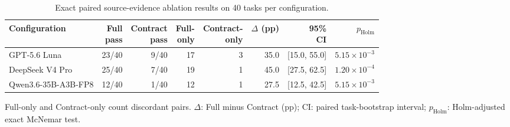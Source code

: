 \begin{table}[tbp]
  \centering
  \footnotesize
  \caption{Exact paired source-evidence ablation results on 40 tasks per configuration.}
  \label{tab:paired-ablation}
  \begin{tabularx}{\linewidth}{@{}Xrrrrrrr@{}}
    \toprule
    Configuration & \shortstack{Full\\pass} & \shortstack{Contract\\pass} & \shortstack{Full-\\only} & \shortstack{Contract-\\only} & \shortstack{$\Delta$\\(pp)} & \shortstack{95\%\\CI} & $p_{\mathrm{Holm}}$ \\
    \midrule
    GPT-5.6 Luna & 23/40 & 9/40 & 17 & 3 & 35.0 & [15.0, 55.0] & $5.15\times10^{-3}$ \\
    DeepSeek V4 Pro & 25/40 & 7/40 & 19 & 1 & 45.0 & [27.5, 62.5] & $1.20\times10^{-4}$ \\
    Qwen3.6-35B-A3B-FP8 & 12/40 & 1/40 & 12 & 1 & 27.5 & [12.5, 42.5] & $5.15\times10^{-3}$ \\
    \bottomrule
  \end{tabularx}
  \par\smallskip\begin{minipage}{\linewidth}\scriptsize
  Full-only and Contract-only count discordant pairs. $\Delta$: Full minus Contract (pp); CI: paired task-bootstrap interval; $p_{\mathrm{Holm}}$: Holm-adjusted exact McNemar test.
  \end{minipage}
\end{table}
